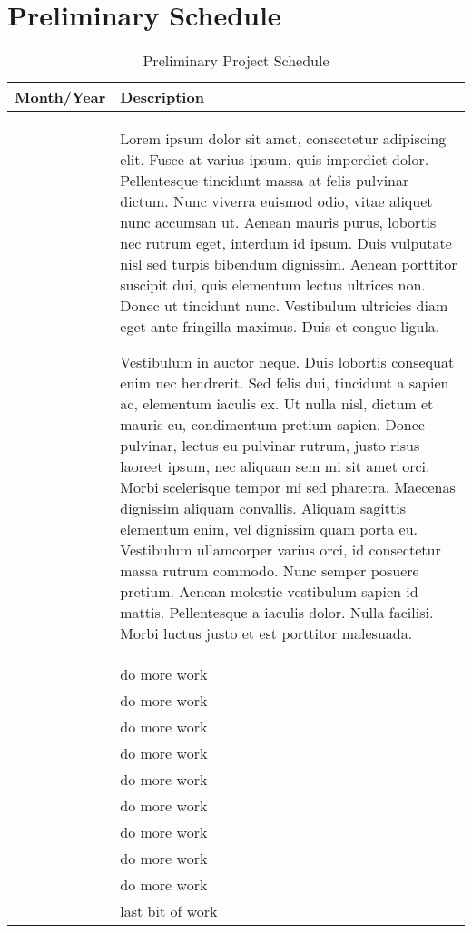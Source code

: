 %
\chapter{Preliminary Schedule}
\label{sec:schedule}


\begin{table}[ht]
\centering
\begin{tabularx}{\linewidth}{
    |>{\hsize=0.5\hsize}X|%
    >{\hsize=1.5\hsize}X|%
} \hline
 \textbf{Month/Year} & \textbf{Description} \\ \hline
\rowcolor{mymagenta1}{July 2016} & {Lorem ipsum dolor sit amet, consectetur adipiscing elit. Fusce at varius ipsum, quis imperdiet dolor. Pellentesque tincidunt massa at felis pulvinar dictum. Nunc viverra euismod odio, vitae aliquet nunc accumsan ut. Aenean mauris purus, lobortis nec rutrum eget, interdum id ipsum. Duis vulputate nisl sed turpis bibendum dignissim. Aenean porttitor suscipit dui, quis elementum lectus ultrices non. Donec ut tincidunt nunc. Vestibulum ultricies diam eget ante fringilla maximus. Duis et congue ligula.

Vestibulum in auctor neque. Duis lobortis consequat enim nec hendrerit. Sed felis dui, tincidunt a sapien ac, elementum iaculis ex. Ut nulla nisl, dictum et mauris eu, condimentum pretium sapien. Donec pulvinar, lectus eu pulvinar rutrum, justo risus laoreet ipsum, nec aliquam sem mi sit amet orci. Morbi scelerisque tempor mi sed pharetra. Maecenas dignissim aliquam convallis. Aliquam sagittis elementum enim, vel dignissim quam porta eu. Vestibulum ullamcorper varius orci, id consectetur massa rutrum commodo. Nunc semper posuere pretium. Aenean molestie vestibulum sapien id mattis. Pellentesque a iaculis dolor. Nulla facilisi. Morbi luctus justo et est porttitor malesuada.} \\ \hline
 \rowcolor{mymagenta2}{August 2016} & {do more work} \\ \hline
 \rowcolor{mymagenta3}{September 2016} & {do more work} \\ \hline
 \rowcolor{mymagenta4}{October 2016}   & {do more work} \\ \hline
 \rowcolor{mymagenta5}{November 2016}  & {do more work} \\ \hline
 \rowcolor{mymagenta6}{December 2016}  & {do more work} \\ \hline
 \rowcolor{mymagenta7}{January 2017}   & {do more work} \\ \hline
 \rowcolor{mymagenta8}{February 2017}  & {do more work} \\ \hline
 \rowcolor{mymagenta9}{March 2017}     & {do more work} \\ \hline
 \rowcolor{mymagenta10}{April 2017}     & {do more work} \\ \hline
 \rowcolor{mymagenta1}{May 2017}       & {last bit of work} \\ \hline 
\end{tabularx}
\caption{Preliminary Project Schedule}
\label{sec:schedule:preliminary-schedule}
\end{table}



